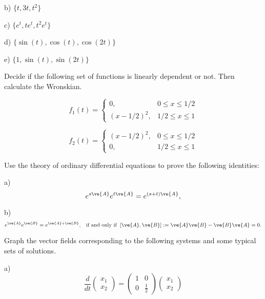 b) $\{t,3t,t^2\}$

c) $\{e^t, te^t, t^2e^t\}$

d) $\{ \sin(t), \cos(t), \cos(2t) \}$

e) $\{1, \sin(t), \sin(2t)\}$
\epro

\bpro
Decide if the following set of functions is linearly dependent or not. Then calculate the Wronskian.

\begin{equation}
  f_1(t) = \left\{
    \begin{array}{ll}
      0, & 0 \leq x \leq 1/2 \\
      (x-1/2)^2, & 1/2 \leq x \leq 1
    \end{array}
    \right.
\end{equation}

\begin{equation}
  f_2(t) = \left\{
    \begin{array}{ll}
      (x-1/2)^2, & 0 \leq x \leq 1/2 \\
      0, & 1/2 \leq x \leq 1
    \end{array}
    \right.
\end{equation}
\epro

\bpro
Use the theory of ordinary differential equations to prove the following identities:

a)
\begin{equation}
  e^{s\ve{A}} e^{t\ve{A}} = e^{(s+t)\ve{A}},
\end{equation}
 
b)
\begin{equation}
  e^{\ve{A}} e^{\ve{B}} = e^{\ve{A}+\ve{B}},\;\;\; 
  \mbox{if and only if} \;\;[\ve{A},\ve{B}] := \ve{A}\ve{B} - \ve{B}\ve{A}= 0.
\end{equation}
\epro


\bpro
Graph the vector fields corresponding to the following systems and some typical sets of solutions.

a) 
\begin{equation}
  \label{eq:prob5_2a}
  \frac{d}{dt}\left(
    \begin{array}{c}
      x_1 \\ x_2
    \end{array}
  \right) = 
    \left(
      \begin{array}{cc}
        1 & 0 \\ 0 & \frac{1}{2}
      \end{array}
    \right) \left(
      \begin{array}{c}
        x_1 \\ x_2
      \end{array}
      \right)
\end{equation}

